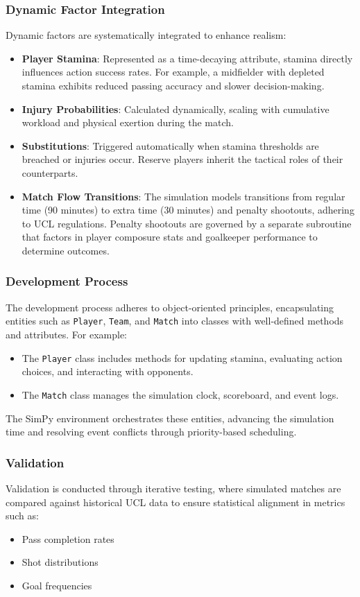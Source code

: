 \documentclass[12pt]{article}
\begin{document}
\subsubsection{Dynamic Factor Integration}
Dynamic factors are systematically integrated to enhance realism:
\begin{itemize}
    \item \textbf{Player Stamina}: Represented as a time-decaying attribute, stamina directly influences action success rates. For example, a midfielder with depleted stamina exhibits reduced passing accuracy and slower decision-making.
    \item \textbf{Injury Probabilities}: Calculated dynamically, scaling with cumulative workload and physical exertion during the match.
    \item \textbf{Substitutions}: Triggered automatically when stamina thresholds are breached or injuries occur. Reserve players inherit the tactical roles of their counterparts.
    \item \textbf{Match Flow Transitions}: The simulation models transitions from regular time (90 minutes) to extra time (30 minutes) and penalty shootouts, adhering to UCL regulations. Penalty shootouts are governed by a separate subroutine that factors in player composure stats and goalkeeper performance to determine outcomes.
\end{itemize}

\subsubsection{Development Process}
The development process adheres to object-oriented principles, encapsulating entities such as \texttt{Player}, \texttt{Team}, and \texttt{Match} into classes with well-defined methods and attributes. For example:
\begin{itemize}
    \item The \texttt{Player} class includes methods for updating stamina, evaluating action choices, and interacting with opponents.
    \item The \texttt{Match} class manages the simulation clock, scoreboard, and event logs.
\end{itemize}

The SimPy environment orchestrates these entities, advancing the simulation time and resolving event conflicts through priority-based scheduling.

\subsubsection{Validation}
Validation is conducted through iterative testing, where simulated matches are compared against historical UCL data to ensure statistical alignment in metrics such as:
\begin{itemize}
    \item Pass completion rates
    \item Shot distributions
    \item Goal frequencies
\end{itemize}
\end{document}

